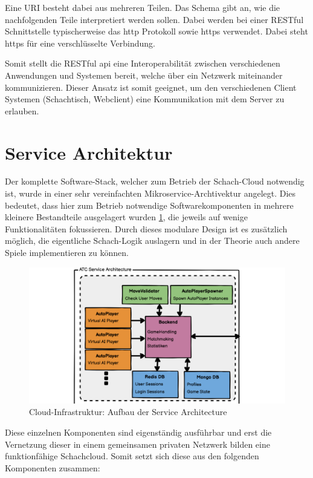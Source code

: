 Eine URI besteht dabei aus mehreren Teilen. Das Schema gibt an, wie die
nachfolgenden Teile interpretiert werden sollen. Dabei werden bei einer
RESTful Schnittstelle typischerweise das \gls{http} Protokoll sowie
\gls{https} verwendet. Dabei steht \gls{https} für eine verschlüsselte
Verbindung.

Somit stellt die RESTful \gls{api} eine Interoperabilität zwischen
verschiedenen Anwendungen und Systemen bereit, welche über ein Netzwerk
miteinander kommunizieren. Dieser Ansatz ist somit geeignet, um den
verschiedenen Client Systemen (Schachtisch, Webclient) eine
Kommunikation mit dem Server zu erlauben.

\hypertarget{service-architektur}{%
\section{Service Architektur}\label{service-architektur}}

Der komplette Software-Stack, welcher zum Betrieb der Schach-Cloud
notwendig ist, wurde in einer sehr vereinfachten
Mikroservice-Archtivektur angelegt. Dies bedeutet, dass hier zum Betrieb
notwendige Softwarekomponenten in mehrere kleinere Bestandteile
ausgelagert wurden \ref{ATC_Service_Architecture}, die jeweils auf
wenige Funktionalitäten fokussieren. Durch dieses modulare Design ist es
zusätzlich möglich, die eigentliche Schach-Logik auslagern und in der
Theorie auch andere Spiele implementieren zu können.

\begin{figure}
\centering
\includegraphics{images/ATC_Service_Architecture.png}
\caption{Cloud-Infrastruktur: Aufbau der Service Architecture
\label{ATC_Service_Architecture}}
\end{figure}

Diese einzelnen Komponenten sind eigenständig ausführbar und erst die
Vernetzung dieser in einem gemeinsamen privaten Netzwerk bilden eine
funktionfähige Schachcloud. Somit setzt sich diese aus den folgenden
Komponenten zusammen:

